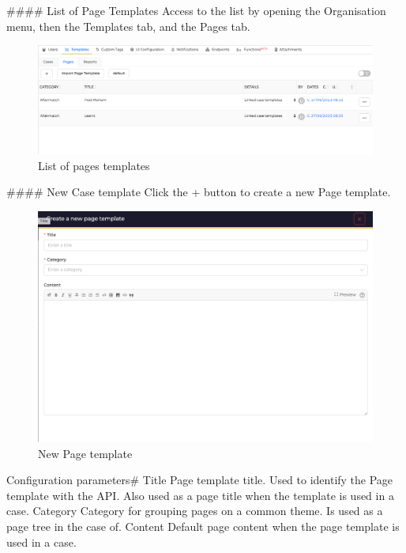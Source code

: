 


\begin{markdown}
#### List of Page Templates
Access to the list by opening the Organisation menu, then the Templates tab, and the Pages tab.
\end{markdown}

\begin{figure}[H]
    \centering
    \includegraphics[width=\textwidth]{images/docs/org_admin/templates/page/organisation-pages-templates.png}
    \caption{List of pages templates}
    \label{fig:modules}
\end{figure}

\begin{markdown}

#### New Case template
Click the + button to create a new Page template.
\end{markdown}



\begin{figure}[H]
    \centering
    \includegraphics[width=\textwidth]{images/docs/org_admin/templates/page/organisation-pages-templates-2.png}
    \caption{New Page template}
    \label{fig:modules}
\end{figure}


Configuration parameters#
Title
Page template title. Used to identify the Page template with the API. Also used as a page title when the template is used in a case.
Category
Category for grouping pages on a common theme. Is used as a page tree in the case of.
Content
Default page content when the page template is used in a case.


